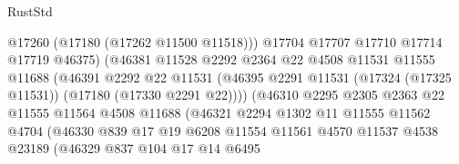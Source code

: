 \begin{lexlean}{RustStd}
\begin{coremodule}
                                    @17260
                                    (@17180 (@17262 @11500 @11518)))
                                  @17704
                                  @17707
                                  @17710
                                  @17714
                                  @17719
                                  @46375)
                                (@46381
                                  @11528
                                  @2292
                                  @2364
                                  @22
                                  @4508
                                  @11531
                                  @11555
                                  @11688
                                  (@46391
                                    @2292
                                    @22
                                    @11531
                                    (@46395
                                      @2291
                                      @11531
                                      (@17324 (@17325 @11531))
                                      (@17180 (@17330 @2291 @22))))
                                  (@46310
                                    @2295
                                    @2305
                                    @2363
                                    @22
                                    @11555
                                    @11564
                                    @4508
                                    @11688
                                    (@46321
                                      @2294
                                      @1302
                                      @11
                                      @11555
                                      @11562
                                      @4704
                                      (@46330
                                        @839
                                        @17
                                        @19
                                        @6208
                                        @11554
                                        @11561
                                        @4570
                                        @11537
                                        @4538
                                        @23189
                                        (@46329
                                          @837
                                          @104
                                          @17
                                          @14
                                          @6495

\end{coremodule}
\end{lexlean}
